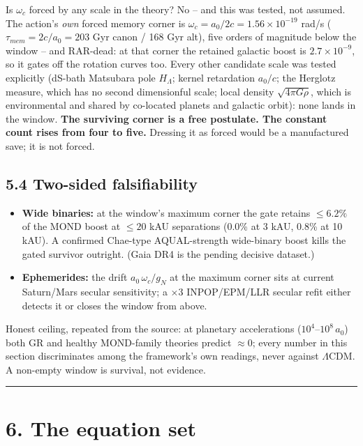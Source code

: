 \documentclass[
]{article}
\newcounter{none} %
\providecommand{\tightlist}{%
  \setlength{\itemsep}{0pt}\setlength{\parskip}{0pt}}
\begin{document}
Is \(\omega_c\) forced by any scale in the theory? No -- and this was
tested, not assumed. The action's \emph{own} forced memory corner is
\(\omega_c = a_0/2c = 1.56 \times 10^{-19}\) rad/s
(\(\tau_{mem} = 2c/a_0 = 203\) Gyr canon / 168 Gyr alt), five orders of
magnitude below the window -- and RAR-dead: at that corner the retained
galactic boost is \(2.7 \times 10^{-9}\), so it gates off the rotation
curves too. Every other candidate scale was tested explicitly (dS-bath
Matsubara pole \(H_\Lambda\); kernel retardation \(a_0/c\); the Herglotz
measure, which has no second dimensionful scale; local density
\(\sqrt{4\pi G \rho}\), which is environmental and shared by co-located
planets and galactic orbit): none lands in the window. \textbf{The
surviving corner is a free postulate. The constant count rises from four
to five.} Dressing it as forced would be a manufactured save; it is not
forced.

\subsection{5.4 Two-sided
falsifiability}\label{two-sided-falsifiability}

\begin{itemize}
\tightlist
\item
  \textbf{Wide binaries:} at the window's maximum corner the gate
  retains \(\le 6.2\%\) of the MOND boost at \(\le 20\) kAU separations
  (0.0\% at 3 kAU, 0.8\% at 10 kAU). A confirmed Chae-type
  AQUAL-strength wide-binary boost kills the gated survivor outright.
  (Gaia DR4 is the pending decisive dataset.)
\item
  \textbf{Ephemerides:} the drift \(a_0\,\omega_c/g_N\) at the maximum
  corner sits at current Saturn/Mars secular sensitivity; a \(\times 3\)
  INPOP/EPM/LLR secular refit either detects it or closes the window
  from above.
\end{itemize}

Honest ceiling, repeated from the source: at planetary accelerations
(\(10^4\)--\(10^8\, a_0\)) both GR and healthy MOND-family theories
predict \(\approx 0\); every number in this section discriminates among
the framework's own readings, never against \(\Lambda\)CDM. A non-empty
window is survival, not evidence.

\begin{center}\rule{0.5\linewidth}{0.5pt}\end{center}

\section{6. The equation set}\label{the-equation-set}
\end{document}

